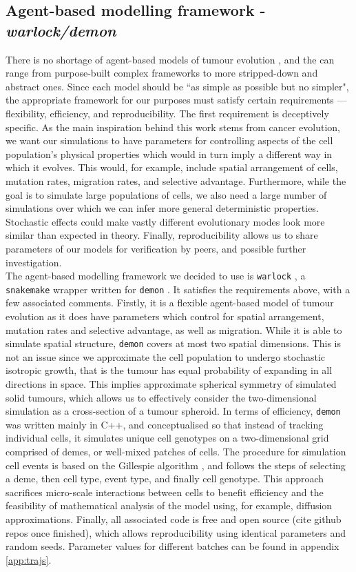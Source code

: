 \subsection{Agent-based modelling framework - \textit{warlock/demon}}
There is no shortage of agent-based models of tumour evolution
\cite{colyer_seven-step_2023}, and the can range from purpose-built complex
frameworks to more stripped-down and abstract ones. Since each model should be
``as simple as possible but no simpler", the appropriate framework for our
purposes must satisfy certain requirements --- flexibility, efficiency, and
reproducibility. The first requirement is deceptively specific. As the main
inspiration behind this work stems from cancer evolution, we want our
simulations to have parameters for controlling aspects of the cell population's
physical properties which would in turn imply a different way in which it
evolves. This would, for example, include spatial arrangement of cells, mutation
rates, migration rates, and selective advantage. Furthermore, while the goal is
to simulate large populations of cells, we also need a large number of
simulations over which we can infer more general deterministic properties.
Stochastic effects could make vastly different evolutionary modes look more
similar than expected in theory. Finally, reproducibility allows us to share
parameters of our models for verification by peers, and possible further
investigation.\\
The agent-based modelling framework we decided to use is \texttt{warlock}
\cite{bak_warlock_2023}, a \texttt{snakemake} wrapper written for \texttt{demon}
\cite{noble_demon_2020}. It satisfies the requirements above, with a few
associated comments. Firstly, it is a flexible agent-based model of tumour
evolution as it does have parameters which control for spatial arrangement,
mutation rates and selective advantage, as well as migration. While it is able
to simulate spatial structure, \texttt{demon} covers at most two spatial
dimensions. This is not an issue since we approximate the cell population to
undergo stochastic isotropic growth, that is the tumour has equal probability of
expanding in all directions in space. This implies approximate spherical
symmetry of simulated solid tumours, which allows us to effectively consider the
two-dimensional simulation as a cross-section of a tumour spheroid. In terms of
efficiency, \texttt{demon} was written mainly in C++, and conceptualised so that
instead of tracking individual cells, it simulates unique cell genotypes on a
two-dimensional grid comprised of demes, or well-mixed patches of cells. The
procedure for simulation cell events is based on the Gillespie algorithm
\cite{gillespie_exact_1977}, and follows the steps of selecting a deme, then
cell type, event type, and finally cell genotype. This approach sacrifices
micro-scale interactions between cells to benefit efficiency and the feasibility
of mathematical analysis of the model using, for example, diffusion
approximations. Finally, all associated code is free and open source (cite
github repos once finished), which allows reproducibility using identical
parameters and random seeds. Parameter values for different batches can be found
in appendix \ref{app:trajs}.


